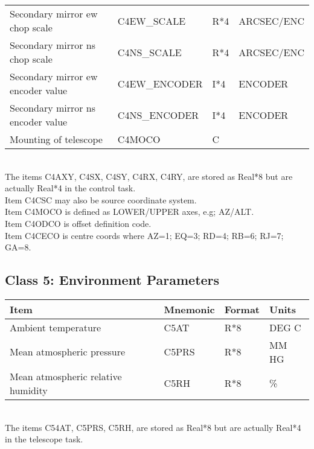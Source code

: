\begin{tabular}{||l|l|l|l||}
Secondary mirror ew chop scale                                 & C4EW\_SCALE   & R*4 & ARCSEC/ENC\\      
Secondary mirror ns chop scale                                 & C4NS\_SCALE   & R*4 & ARCSEC/ENC\\      
Secondary mirror ew encoder value                              & C4EW\_ENCODER & I*4 & ENCODER   \\      
Secondary mirror ns encoder value                              & C4NS\_ENCODER & I*4 & ENCODER   \\      
Mounting of telescope                                          & C4MOCO        & C   &  ~        \\ \hline
\end{tabular}
 \\

 The items C4AXY, C4SX, C4SY, C4RX, C4RY, are stored as 
Real*8 but are actually Real*4 in the control task. \\

 Item C4CSC may also be source coordinate system.\\ 
 Item C4MOCO is defined as LOWER/UPPER axes, e.g; AZ/ALT.\\
 Item C4ODCO is offset definition code. \\
 Item C4CECO is centre coords where AZ=1; EQ=3; RD=4; RB=6; RJ=7; GA=8. \\

                                                                    
\subsection{Class 5: Environment Parameters}                           


\begin{tabular}{||l|l|l|l||} \hline
Item                                & Mnemonic & Format & Units \\ \hline
Ambient temperature                 & C5AT     & R*8    & DEG C \\
Mean atmospheric pressure           & C5PRS    & R*8    & MM HG \\
Mean atmospheric relative humidity  & C5RH     & R*8    & \%    \\ \hline
\end{tabular}
 \\

 The items C54AT, C5PRS, C5RH, are stored as Real*8 
but are actually Real*4 in the telescope task.




